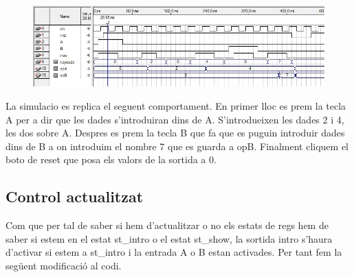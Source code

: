 \documentclass[12pt, a4papre]{article}
\begin{document}
	\begin{figure}[H]
		\begin{center}
		\includegraphics[width=130mm]{regsExtrSim.jpeg}
		\end{center}
	\end{figure}
	
	La simulacio es replica el seguent comportament. En primer lloc es prem la tecla A per a dir que les dades s'introduiran dins de A. S'introdueixen les dades 2 i 4, les dos sobre A. Despres es prem la tecla B que fa que es puguin introduir dades dins de B a on introduim el nombre 7 que es guarda a opB. Finalment cliquem el boto de reset que posa els valors de la sortida a 0.
	
	\subsection{Control actualitzat}
	
	Com que per tal de saber si hem d'actualitzar o no els estats de regs hem de saber si estem en el estat st\_intro o el estat st\_show, la sortida intro s'haura d'activar si estem a st\_intro i la entrada A o B estan activades. Per tant fem la següent modificació al codi.
	
\end{document}
